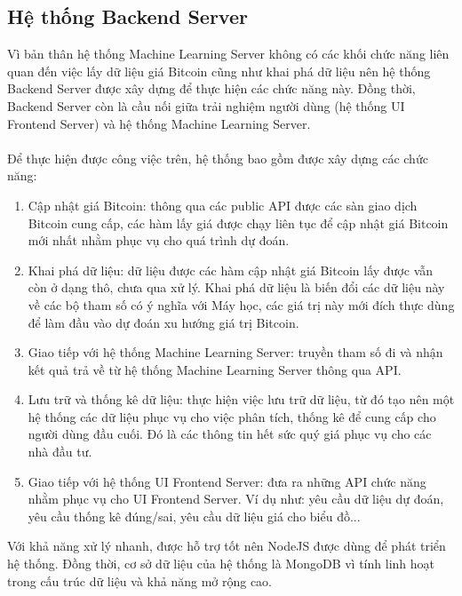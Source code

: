 \subsection{ Hệ thống Backend Server}
Vì bản thân hệ thống Machine Learning Server không có các khối chức năng 
liên quan đến việc  
lấy dữ liệu giá Bitcoin cũng như khai phá dữ liệu nên hệ thống Backend Server
được xây dựng để thực hiện các chức năng này. Đồng thời, Backend Server còn là 
cầu nối giữa trải nghiệm người dùng (hệ thống UI Frontend Server) và hệ thống 
Machine Learning Server.\\\\
Để thực hiện được công việc trên, hệ thống bao gồm được xây dựng các chức năng:\\
\begin{enumerate}
\item Cập nhật giá Bitcoin: thông qua các public API được các sàn giao dịch 
Bitcoin cung cấp, các hàm lấy giá được chạy liên tục để cập nhật giá Bitcoin 
mới nhất nhằm phục vụ cho quá trình dự đoán.
\item Khai phá dữ liệu: dữ liệu được các hàm cập nhật giá Bitcoin lấy được vẫn 
còn ở dạng thô, chưa qua xử lý. Khai phá dữ liệu là biến đổi các dữ liệu này 
về các bộ tham số có ý nghĩa với Máy học, các giá trị này mới đích thực 
dùng để làm đầu vào dự đoán xu hướng giá trị Bitcoin.
\item Giao tiếp với hệ thống Machine Learning Server: truyền tham số đi và nhận 
kết quả trả về từ hệ thống Machine Learning Server thông qua API.
\item Lưu trữ và thống kê dữ liệu: thực hiện việc lưu trữ dữ liệu, từ đó tạo nên 
một hệ thống các dữ liệu phục vụ cho việc phân tích, thống kê để cung cấp cho người 
dùng đầu cuối. Đó là các thông tin hết sức quý giá phục vụ cho các nhà đầu tư.
\item Giao tiếp với hệ thống UI Frontend Server: đưa ra những API chức năng nhằm 
phục vụ cho UI Frontend Server. Ví dụ như: yêu cầu dữ liệu dự đoán, yêu cầu 
thống kê đúng/sai, yêu cầu dữ liệu giá cho biểu đồ...
\end{enumerate}
Với khả năng xử lý nhanh, được hỗ trợ tốt nên NodeJS được dùng để phát triển 
hệ thống. Đồng thời, cơ sở dữ liệu của hệ thống là MongoDB vì tính linh hoạt 
trong cấu trúc dữ liệu và khả năng mở rộng cao.\\\\
